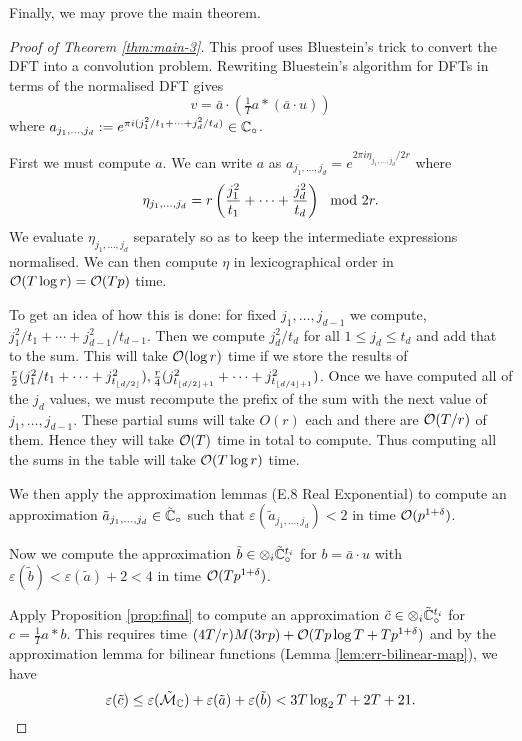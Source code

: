 Finally, we may prove the main theorem.

\begin{proof}[Proof of Theorem \eqref{thm:main-3}]
    This proof uses Bluestein's trick to convert the DFT into a convolution problem. Rewriting Bluestein's algorithm for DFTs in terms of the normalised DFT gives
    \[
        v = \bar{a} \cdot (\tfrac{1}{T}a \ast (\bar{a} \cdot u))
    \]
    where $a_{j_1, \ldots, j_d} := e^{\pi i (j_1^2 / t_1 + \cdots + j_d^2 / t_d)} \in {\mathbb C}_\circ$.


    First we must compute $a$. We can write $a$ as $a_{j_1, \ldots, j_d} = e^{2\pi i \eta_{j_1, \ldots, j_d}/2r}$ where
    \[
        \eta_{j_1, \ldots, j_d} = r\left(\frac{j_1^2}{t_1} + \cdots + \frac{j_d^2}{t_d}\right) \mod 2r.
    \]
    We evaluate $\eta_{j_1, \ldots, j_d}$ separately so as to keep the intermediate expressions normalised. We can then compute $\eta$ in lexicographical order in $\mathcal O(T \log r) = \mathcal O(T p)$ time. 

    To get an idea of how this is done: for fixed $j_1, \ldots, j_{d-1}$ we compute, $j_1^2/t_1 + \cdots + j_{d-1}^2/t_{d-1}$. Then we compute $j_d^2/t_d$ for all $1 \le j_d \le t_d$ and add that to the sum. This will take $\mathcal O(\log r)$ time if we store the results of $\frac{r}{2}(j_1^2/t_1 + \cdots + j^2_{t_{\left \lfloor d/2 \right \rfloor}}), \frac{r}{4}(j_{t_{\left \lfloor d/2 \right \rfloor+1}}^2 + \cdots + j^2_{t_{\left \lfloor d/4 \right \rfloor+1}})$. Once we have computed all of the $j_d$ values, we must recompute the prefix of the sum with the next value of $j_1, \ldots, j_{d-1}$. These partial sums will take $O(r)$ each and there are $\mathcal O(T/r)$ of them. Hence they will take $\mathcal O(T)$ time in total to compute. Thus computing all the sums in the table will take $\mathcal O(T \log r)$ time. 

    We then apply the approximation lemmas (E.8 Real Exponential) to compute an approximation $\tilde{a}_{j_1, \ldots, j_d} \in \tilde{{\mathbb C}}_\circ$ such that $\varepsilon(\tilde{a}_{j_1, \ldots, j_d}) < 2$ in time $\mathcal O(p^{1 + \delta})$.

    Now we compute the approximation $\tilde{b} \in \otimes_i \tilde{{\mathbb C}}^{t_i}_\circ$ for $b = \bar{a} \cdot u$ with $\varepsilon(\tilde{b}) < \varepsilon(\tilde{a}) + 2 < 4$ in time $\mathcal O(T p^{1 + \delta})$.

    Apply Proposition \ref{prop:final} to compute an approximation $\tilde{c} \in \otimes_i \tilde{{\mathbb C}}^{t_i}_\circ$ for $c = \tfrac{1}{T} a \ast b$. This requires time $(4T/r)M(3rp) + \mathcal O(Tp\log T + Tp^{1 + \delta})$ and by the approximation lemma for bilinear functions (Lemma \ref{lem:err-bilinear-map}), we have
    \[
        \varepsilon(\tilde{c}) \le \varepsilon(\tilde{\mathcal M}_{\mathbb C}) + \varepsilon(\tilde{a}) + \varepsilon(\tilde{b}) < 3T\log_2 T + 2T + 21.
    \]


\end{proof}
